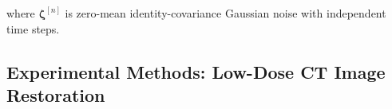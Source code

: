 \documentclass[12pt,]{article}
\begin{document}
\noindent where $\boldsymbol{\zeta}^{[n]}$ is zero-mean identity-covariance Gaussian noise with independent time steps. 









\newpage
\subsection{Experimental Methods: Low-Dose CT Image Restoration}
\end{document}

